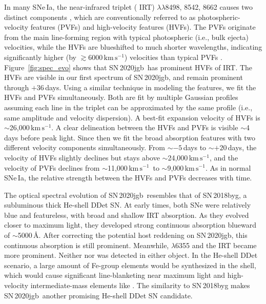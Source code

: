 \documentclass[twocolumn]{aastex631}
\newcommand{\sn}{SN\,2020jgb}
\newcommand{\kms}{$\mathrm{km}\,\mathrm{s}^{-1}$}
\begin{document}
In many SNe\,Ia, the  near-infrared triplet ( IRT) $\lambda\lambda$8498, 8542, 8662 causes two distinct components \citep{Mazzali_2005}, which are conventionally referred to as photospheric-velocity features (PVFs) and high-velocity features (HVFs). The PVFs originate from the main line-forming region with typical photospheric (i.e., bulk ejecta) velocities, while the HVFs are blueshifted to much shorter wavelengths, indicating significantly higher (by $\gtrsim$6000\,\kms) velocities than typical PVFs \citep{Silverman_HVF_2015}. Figure~\ref{fig:spec_evo} shows that \sn\ has prominent HVFs of  IRT. The HVFs are visible in our first spectrum of \sn, and remain prominent through $+36$\,days. Using a similar technique in modeling the  features, we fit the HVFs and PVFs simultaneously. Both are fit by multiple Gaussian profiles assuming each line in the triplet can be approximated by the same profile (i.e., same amplitude and velocity dispersion). A best-fit expansion velocity of HVFs is $\sim$26,000\,\kms. A clear delineation between the HVFs and PVFs is visible $\sim$4\,days before peak light. Since then we fit the broad absorption features with two different velocity components simultaneously. From $\sim$$-5$\,days to $\sim$$+20$\,days, the velocity of HVFs slightly declines but stays above $\sim$24,000\,\kms, and the velocity of PVFs declines from $\sim$11,000\,\kms\ to $\sim$9,000\,\kms. As in normal SNe\,Ia, the relative strength between the HVFs and PVFs decreases with time.

The optical spectral evolution of \sn\ resembles that of SN\,2018byg, a subluminous thick He-shell DDet SN. At early times, both SNe were relatively blue and featureless, with broad and shallow  IRT absorption. As they evolved closer to maximum light, they developed strong continuous absorption blueward of $\sim$5000\,\AA. After correcting the potential host reddening on \sn, this continuous absorption is still prominent. Meanwhile,  $\lambda$6355 and the  IRT became more prominent. Neither  nor  was detected in either object. In the He-shell DDet scenario, a large amount of Fe-group elements would be synthesized in the shell, which would cause significant line-blanketing near maximum light \citep{Kromer_DD_2010, polin_observational_2019} and high-velocity intermediate-mass elements like  \citep{Fink_DD_2010, Kromer_DD_2010,Shen_DD_2014}. The similarity to SN\,2018byg makes \sn\ another promising He-shell DDet SN candidate.
\end{document}
